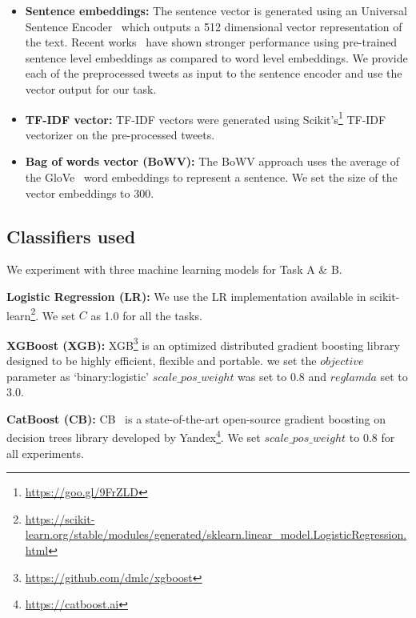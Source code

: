 \documentclass[11pt]{article}
\begin{document}
  
\begin{itemize}
    \item \textbf{Sentence embeddings:}
The sentence vector is generated using an Universal Sentence Encoder~\cite{cer2018universal} which outputs a 512 dimensional vector representation of the text. Recent works~\cite{conneau2017supervised} have shown stronger performance using pre-trained sentence level embeddings as compared to word level embeddings. We provide each of the preprocessed tweets as input to the sentence encoder and use the vector output for our task.

\item \textbf{TF-IDF vector: }
TF-IDF vectors were generated using Scikit's\footnote{\url{https://goo.gl/9FrZLD}} TF-IDF vectorizer on the pre-processed tweets.

\item \textbf{Bag of words vector (BoWV): }
The BoWV approach uses the average of the GloVe~\cite{pennington2014glove} word embeddings to represent a sentence. We set the size of the vector embeddings to 300.

\end{itemize}











\subsection{Classifiers used} 
We experiment with three machine learning models for Task A \& B.

\noindent\textbf{Logistic Regression (LR):} We use the LR implementation available in scikit-learn\footnote{\url{https://scikit-learn.org/stable/modules/generated/sklearn.linear_model.LogisticRegression.html}}. We set $C$ as 1.0 for all the tasks.

\noindent\textbf{XGBoost (XGB):} XGB\footnote{\url{https://github.com/dmlc/xgboost}} is an optimized distributed gradient boosting library designed to be highly efficient, flexible and portable. we set the $objective$ parameter as `binary:logistic' $scale\_pos\_weight$ was set to 0.8 and $reglamda$ set to 3.0.

\noindent\textbf{CatBoost (CB):}
CB~\cite{dorogush2017catboost} is a state-of-the-art open-source gradient boosting on decision trees library developed by Yandex\footnote{\url{https://catboost.ai}}. We set $scale\_pos\_weight$ to 0.8 for all experiments.
\end{document}
